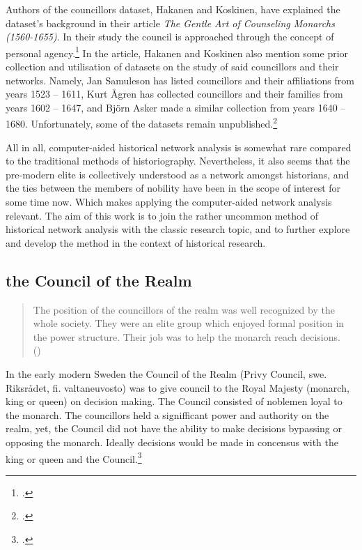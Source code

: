 Authors of the councillors dataset, Hakanen and Koskinen, have explained the dataset's background in their article \textit{The Gentle Art of Counseling Monarchs (1560-1655)}. In their study the council is approached through the concept of personal agency.\footcite{HakanenAKoskinen2017} In the article, Hakanen and Koskinen also mention some prior collection and utilisation of datasets on the study of said councillors and their networks. Namely, Jan Samuleson has listed councillors and their affiliations from years 1523 – 1611, Kurt Ågren has collected councillors and their families from years 1602 – 1647, and Björn Asker made a similar collection from years 1640 – 1680. Unfortunately, some of the datasets remain unpublished.\footcite[p. 48, 67 (cite 4).]{HakanenAKoskinen2017} 

All in all, computer-aided historical network analysis is somewhat rare compared to the traditional methods of historiography. Nevertheless, it also seems that the pre-modern elite is collectively understood as a network amongst historians, and the ties between the members of nobility have been in the scope of interest for some time now. Which makes applying the computer-aided network analysis relevant. The aim of this work is to join the rather uncommon method of historical network analysis with the classic research topic, and to further explore and develop the method in the context of historical research.

\subsection{the Council of the Realm}
\label{councilofrealm}
\begin{quote}
	The position of the councillors of the realm was well recognized by the whole society. They were an elite group which enjoyed formal position in the power structure. Their job was to help the monarch reach decisions.\\
	(\cite[p. 26.]{agencyAndStateBuilding})
\end{quote}

In the early modern Sweden the Council of the Realm (Privy Council, swe. Riksrådet, fi. valtaneuvosto) was to give council to the Royal Majesty (monarch, king or queen) on decision making. The Council consisted of noblemen loyal to the monarch. The councillors held a signifficant power and authority on the realm, yet, the Council did not have the ability to make decisions bypassing or opposing the monarch. Ideally decisions would be made in concensus with the king or queen and the Council.\footcites[pp. 13-14,]{hopesAndFearsIntro}[pp. 47-50.]{HakanenAKoskinen2017}

